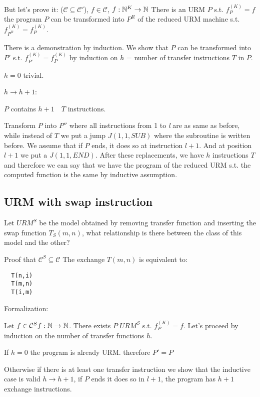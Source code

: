 But let's prove it: ($ \mathcal{C} \subseteq \mathcal{C}' $), $ f \in \mathcal{C} $, $ f: \mathbb{N}^K \rightarrow \mathbb{N} $ There is an URM $P$ s.t. $ f_P^{(K)}  = f$ the program $P$ can be transformed into $P ^R $ of the reduced URM machine s.t. $ f_{P^R}^{(K)}  = f_{P}^{(K)}$.

There is a demonstration by induction. We show that $P$ can be transformed into $P' $ s.t. $ f_{P'}^{(K)}  = f_{P}^{(K)} $ by induction on $h$ = number of transfer instructions $T$ in $P$.

$h = 0$ trivial.

$h \rightarrow  h + 1$:

$P$ contains $h + 1 \quad T$ instructions.

Transform $P$ into $P''$ where all instructions from 1 to \textit{l} are as same as before, while instead of $T$ we put a jump $J(1,1, SUB)$ where the subroutine is written before. We assume that if $P$ ends, it does so at instruction $l + 1$. And at position $l + 1$ we put a $J (1,1, END)$. After these replacements, we have $h$ instructions $T$ and therefore we can say that we have the program of the reduced URM s.t. the computed function is the same by inductive assumption.

\subsection{URM with swap instruction}
Let $URM^S $ be the model obtained by removing transfer function and inserting the swap function $ T_S(m,n) $, what relationship is there between the class of this model and the other?

Proof that $ \mathcal{C}^S \subseteq \mathcal{C} $ The exchange $T (m, n)$ is equivalent to:

\begin{lstlisting}
  T(n,i)
  T(m,n)
  T(i,m)
\end{lstlisting}

Formalization:

Let $ f \in \mathcal{C}^S f:\mathbb{N}\rightarrow \mathbb{N} $. There exists $P$  $URM^S $ s.t. $ f_P^{(K)} = f $. Let's proceed by induction on the number of transfer functions $h$.

If $h = 0$ the program is already URM. therefore $ P' = P $

Otherwise if there is at least one transfer instruction we show that the inductive case is valid $ h \rightarrow h+1 $, if $P$ ends it does so in $l + 1$, the program has $h + 1$ exchange instructions.

